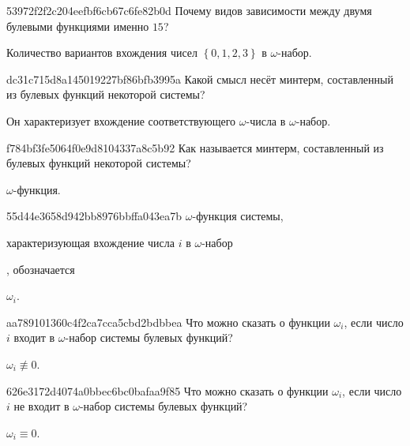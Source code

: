 \begin{note}{53972f2f2c204eefbf6cb67c6fe82b0d}
    Почему видов зависимости между двумя булевыми функциями именно \({ 15 }\)?

    \begin{cloze}{1}
        Количество вариантов вхождения чисел \({ \left\{ 0, 1, 2, 3 \right\} }\) в \({ \omega }\)-набор.
    \end{cloze}
\end{note}

\begin{note}{dc31c715d8a145019227bf86bfb3995a}
    Какой смысл несёт минтерм, составленный из булевых функций некоторой системы?

    \begin{cloze}{1}
        Он характеризует вхождение соответствующего \({ \omega }\)-числа в \({ \omega }\)-набор.
    \end{cloze}
\end{note}

\begin{note}{f784bf3fe5064f0e9d8104337a8c5b92}
    Как называется минтерм, составленный из булевых функций некоторой системы?

    \begin{cloze}{1}
        \({ \omega }\)-функция.
    \end{cloze}
\end{note}

\begin{note}{55d44e3658d942bb8976bbffa043ea7b}
    \({ \omega }\)-функция системы, \begin{icloze}{2}характеризующая вхождение числа \({ i }\) в \({ \omega }\)-набор\end{icloze}, обозначается \begin{icloze}{1}\({ \omega_i }\).\end{icloze}
\end{note}

\begin{note}{aa789101360c4f2ca7cca5cbd2bdbbea}
    Что можно сказать о функции \({ \omega_i }\), если число \({ i }\) входит в \({ \omega }\)-набор системы булевых функций?

    \begin{cloze}{1}
        \({ \omega_i \not\equiv 0 }\).
    \end{cloze}
\end{note}

\begin{note}{626e3172d4074a0bbec6bc0bafaa9f85}
    Что можно сказать о функции \({ \omega_i }\), если число \({ i }\) не входит в \({ \omega }\)-набор системы булевых функций?

    \begin{cloze}{1}
        \({ \omega_i \equiv 0 }\).
    \end{cloze}
\end{note}

